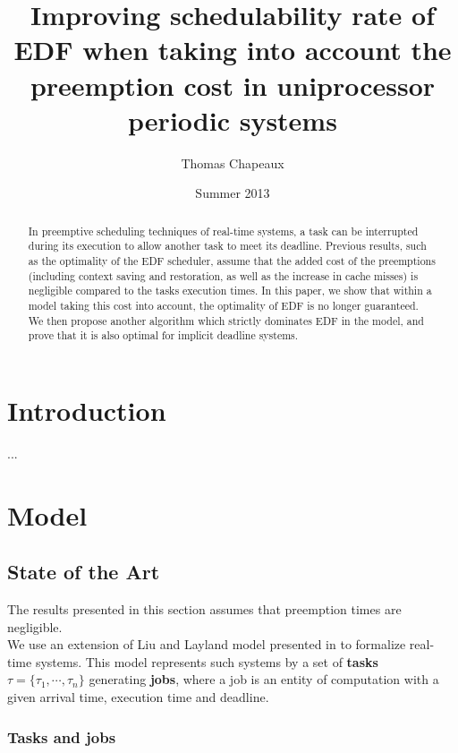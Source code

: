\documentclass[a4paper,10pt]{article}
\title{Improving schedulability rate of EDF when taking into account the preemption cost in uniprocessor periodic systems}
\author{Thomas Chapeaux}
\date{Summer 2013}
\begin{document}
\maketitle

\tableofcontents

\newpage

\begin{abstract}

In preemptive scheduling techniques of real-time systems, a task can be interrupted during its execution to allow another task to meet its deadline. Previous results, such as the optimality of the EDF scheduler, assume that the added cost of the preemptions (including context saving and restoration, as well as the increase in cache misses) is negligible compared to the tasks execution times. In this paper, we show that within a model taking this cost into account, the optimality of EDF is no longer guaranteed. We then propose another algorithm which strictly dominates EDF in the model, and prove that it is also optimal for implicit deadline systems.

\end{abstract}

\newpage

\section{Introduction}

...

\section{Model}

    \subsection{State of the Art}

        The results presented in this section assumes that preemption times are negligible.\\

        We use an extension of Liu and Layland model presented in \cite{Liu:2000:RS:518501} to formalize real-time systems. This model represents such systems by a set of \textbf{tasks} $\tau = \{\tau_1, \cdots, \tau_n\}$ generating \textbf{jobs}, where a job is an entity of computation with a given arrival time, execution time and deadline.

        \subsubsection{Tasks and jobs}
\end{document}

